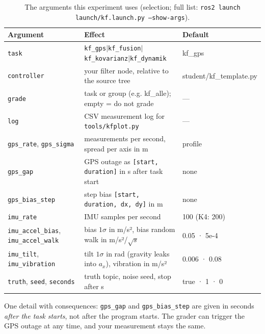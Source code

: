 \documentclass[12pt,a4paper]{scrartcl}
\newcommand{\ordner}[1]{\texttt{#1}}
\newcommand{\kommando}[1]{\texttt{#1}}
\begin{document}
\begin{table}[ht]\centering\small
\caption{The arguments this experiment uses (selection; full list:
\kommando{ros2 launch launch/kf.launch.py --show-args}).}
\label{tab:launch}
\begin{tabular}{@{}lp{6.2cm}l@{}}
\toprule
Argument & Effect & Default \\
\midrule
\kommando{task} & \kommando{kf\_gps}$\vert$\kommando{kf\_fusion}$\vert$\kommando{kf\_kovarianz}$\vert$\kommando{kf\_dynamik} & kf\_gps \\
\kommando{controller} & your filter node, relative to the source tree & student/kf\_template.py \\
\kommando{grade} & task or group (e.g. kf\_alle); empty = do not grade & — \\
\kommando{log} & CSV measurement log for \ordner{tools/kfplot.py} & — \\
\kommando{gps\_rate}, \kommando{gps\_sigma} & measurements per second, spread per axis in m & profile \\
\kommando{gps\_gap} & GPS outage as \kommando{[start, duration]} in s after task start & none \\
\kommando{gps\_bias\_step} & step bias \kommando{[start, duration, dx, dy]} in m & none \\
\kommando{imu\_rate} & IMU samples per second & 100 (K4: 200) \\
\kommando{imu\_accel\_bias}, \kommando{imu\_accel\_walk} & bias \(1\sigma\) in m/s², bias random walk in m/s²/\(\sqrt{s}\) & 0.05 · 5e-4 \\
\kommando{imu\_tilt}, \kommando{imu\_vibration} & tilt \(1\sigma\) in rad (gravity leaks into \(a_x\)), vibration in m/s² & 0.006 · 0.08 \\
\kommando{truth}, \kommando{seed}, \kommando{seconds} & truth topic, noise seed, stop after s & true · 1 · 0 \\
\bottomrule
\end{tabular}
\end{table}

One detail with consequences: \kommando{gps\_gap} and \kommando{gps\_bias\_step} are given
in seconds \emph{after the task starts}, not after the program starts. The grader can
trigger the GPS outage at any time, and your measurement stays the same.
\end{document}
